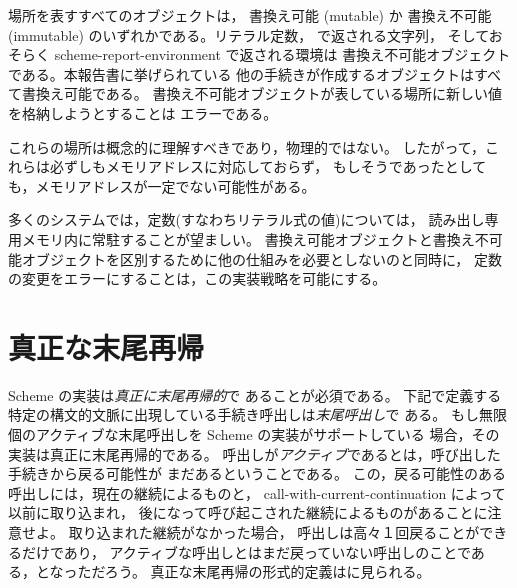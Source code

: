 場所を表すすべてのオブジェクトは，
書換え可能 (mutable) か
書換え不可能 (immutable) のいずれかである。リテラル定数，
 で返される文字列，
そしておそらく {\cf scheme-report-environment} で返される環境は
書換え不可能オブジェクトである。本報告書に挙げられている
他の手続きが作成するオブジェクトはすべて書換え可能である。
書換え不可能オブジェクトが表している場所に新しい値を格納しようとすることは
エラーである。


これらの場所は概念的に理解すべきであり，物理的ではない。
したがって，これらは必ずしもメモリアドレスに対応しておらず，
もしそうであったとしても，メモリアドレスが一定でない可能性がある。

\begin{rationale}
多くのシステムでは，定数(すなわちリテラル式の値)については，
読み出し専用メモリ内に常駐することが望ましい。
書換え可能オブジェクトと書換え不可能オブジェクトを区別するために他の仕組みを必要としないのと同時に，
定数の変更をエラーにすることは，この実装戦略を可能にする。
\end{rationale}

\section{真正な末尾再帰}
\label{proper tail recursion}

Scheme の実装は{\em 真正に末尾再帰的}で
あることが必須である。
下記で定義する特定の構文的文脈に出現している手続き呼出しは{\em 末尾呼出し}で
ある。
もし無限個のアクティブな末尾呼出しを Scheme の実装がサポートしている
場合，その実装は真正に末尾再帰的である。
呼出しが{\em アクティブ}であるとは，呼び出した手続きから戻る可能性が
まだあるということである。
この，戻る可能性のある呼出しには，現在の継続によるものと，
{\cf call-with-current-continuation} によって以前に取り込まれ，
後になって呼び起こされた継続によるものがあることに注意せよ。
取り込まれた継続がなかった場合，
呼出しは高々１回戻ることができるだけであり，
アクティブな呼出しとはまだ戻っていない呼出しのことである，となっただろう。
真正な末尾再帰の形式的定義は\cite{propertailrecursion}に見られる。

